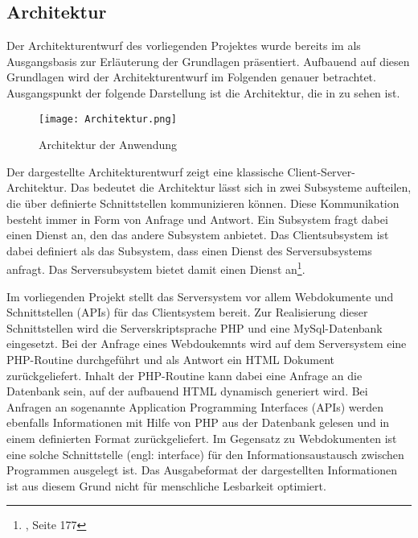 \subsection{Architektur}
\label{sec:Architektur}

Der Architekturentwurf des vorliegenden Projektes wurde bereits im  als Ausgangsbasis zur Erläuterung der Grundlagen präsentiert. Aufbauend auf diesen Grundlagen wird der Architekturentwurf im Folgenden genauer betrachtet. Ausgangspunkt der folgende Darstellung ist die Architektur, die in  zu sehen ist.

\begin{figure}[htb]
\centering
\texttt{[image: Architektur.png]}
\caption[Architektur der Anwendung]{Architektur der
Anwendung\protect\footnotemark}
\label{fig:Architektur}
\end{figure}

Der dargestellte Architekturentwurf zeigt eine klassische Client-Server-Architektur. Das bedeutet die Architektur lässt sich in zwei Subsysteme aufteilen, die über definierte Schnittstellen kommunizieren können. Diese Kommunikation besteht immer in Form von Anfrage und Antwort. Ein Subsystem fragt dabei einen Dienst an, den das andere Subsystem anbietet. Das Clientsubsystem ist dabei definiert als das Subsystem, dass einen Dienst des Serversubsystems anfragt. Das Serversubsystem bietet damit einen Dienst an\footnote{\citet{rautenstrauch2002}, Seite 177}.

Im vorliegenden Projekt stellt das Serversystem vor allem Webdokumente und Schnittstellen (APIs) für das Clientsystem bereit. Zur Realisierung dieser Schnittstellen wird die Serverskriptsprache PHP und eine MySql-Datenbank eingesetzt. Bei der Anfrage eines Webdoukemnts wird auf dem Serversystem eine PHP-Routine durchgeführt und als Antwort ein HTML Dokument zurückgeliefert. Inhalt der PHP-Routine kann dabei eine Anfrage an die Datenbank sein, auf der aufbauend HTML dynamisch generiert wird.
Bei Anfragen an sogenannte Application Programming Interfaces (APIs) werden ebenfalls Informationen mit Hilfe von PHP aus der Datenbank gelesen und in einem definierten Format zurückgeliefert. Im Gegensatz zu Webdokumenten ist eine solche Schnittstelle (engl: interface) für den Informationsaustausch zwischen Programmen ausgelegt ist. Das Ausgabeformat der dargestellten Informationen ist aus diesem Grund nicht für menschliche Lesbarkeit optimiert.

